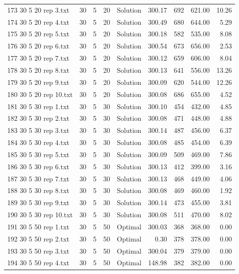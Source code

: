 \begin{longtable}{lrrllrrrr}
173 30 5 20 rep 3.txt & 30 & 5 & 20 & Solution & 300.17 & 692 & 621.00 & 10.26\\
174 30 5 20 rep 4.txt & 30 & 5 & 20 & Solution & 300.49 & 680 & 644.00 &  5.29\\
175 30 5 20 rep 5.txt & 30 & 5 & 20 & Solution & 300.18 & 582 & 535.00 &  8.08\\
176 30 5 20 rep 6.txt & 30 & 5 & 20 & Solution & 300.54 & 673 & 656.00 &  2.53\\
177 30 5 20 rep 7.txt & 30 & 5 & 20 & Solution & 300.12 & 659 & 606.00 &  8.04\\
178 30 5 20 rep 8.txt & 30 & 5 & 20 & Solution & 300.13 & 641 & 556.00 & 13.26\\
179 30 5 20 rep 9.txt & 30 & 5 & 20 & Solution & 300.09 & 620 & 544.00 & 12.26\\
180 30 5 20 rep 10.txt & 30 & 5 & 20 & Solution & 300.08 & 686 & 655.00 &  4.52\\
181 30 5 30 rep 1.txt & 30 & 5 & 30 & Solution & 300.10 & 454 & 432.00 &  4.85\\
182 30 5 30 rep 2.txt & 30 & 5 & 30 & Solution & 300.08 & 471 & 448.00 &  4.88\\
183 30 5 30 rep 3.txt & 30 & 5 & 30 & Solution & 300.14 & 487 & 456.00 &  6.37\\
184 30 5 30 rep 4.txt & 30 & 5 & 30 & Solution & 300.08 & 485 & 454.00 &  6.39\\
185 30 5 30 rep 5.txt & 30 & 5 & 30 & Solution & 300.09 & 509 & 469.00 &  7.86\\
186 30 5 30 rep 6.txt & 30 & 5 & 30 & Solution & 300.13 & 412 & 399.00 &  3.16\\
187 30 5 30 rep 7.txt & 30 & 5 & 30 & Solution & 300.13 & 468 & 449.00 &  4.06\\
188 30 5 30 rep 8.txt & 30 & 5 & 30 & Solution & 300.08 & 469 & 460.00 &  1.92\\
189 30 5 30 rep 9.txt & 30 & 5 & 30 & Solution & 300.14 & 473 & 455.00 &  3.81\\
190 30 5 30 rep 10.txt & 30 & 5 & 30 & Solution & 300.08 & 511 & 470.00 &  8.02\\
191 30 5 50 rep 1.txt & 30 & 5 & 50 & Optimal & 300.03 & 368 & 368.00 &  0.00\\
192 30 5 50 rep 2.txt & 30 & 5 & 50 & Optimal &  0.30 & 378 & 378.00 &  0.00\\
193 30 5 50 rep 3.txt & 30 & 5 & 50 & Optimal & 300.04 & 379 & 379.00 &  0.00\\
194 30 5 50 rep 4.txt & 30 & 5 & 50 & Optimal & 148.98 & 382 & 382.00 &  0.00\\

\end{longtable}
